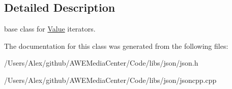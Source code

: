 \subsection{Detailed Description}
base class for \hyperlink{class_json_1_1_value}{Value} iterators. 



The documentation for this class was generated from the following files\-:\begin{DoxyCompactItemize}
\item 
/\-Users/\-Alex/github/\-A\-W\-E\-Media\-Center/\-Code/libs/json/json.\-h\item 
/\-Users/\-Alex/github/\-A\-W\-E\-Media\-Center/\-Code/libs/json/jsoncpp.\-cpp\end{DoxyCompactItemize}
